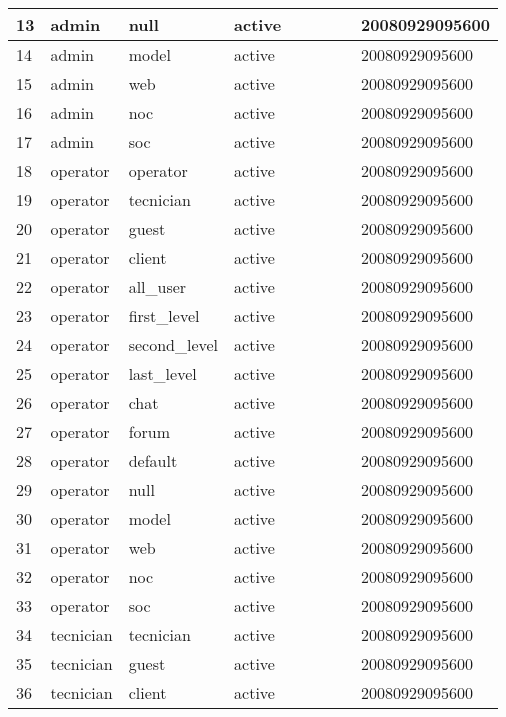 \begin{longtable}{|l|l|l|l|l|l|l|l|l|}
13 & admin & null & active &  &  &  &  & 20080929095600 \\ \hline 
14 & admin & model & active &  &  &  &  & 20080929095600 \\ \hline 
15 & admin & web & active &  &  &  &  & 20080929095600 \\ \hline 
16 & admin & noc & active &  &  &  &  & 20080929095600 \\ \hline 
17 & admin & soc & active &  &  &  &  & 20080929095600 \\ \hline 
18 & operator & operator & active &  &  &  &  & 20080929095600 \\ \hline 
19 & operator & tecnician & active &  &  &  &  & 20080929095600 \\ \hline 
20 & operator & guest & active &  &  &  &  & 20080929095600 \\ \hline 
21 & operator & client & active &  &  &  &  & 20080929095600 \\ \hline 
22 & operator & all\_user & active &  &  &  &  & 20080929095600 \\ \hline 
23 & operator & first\_level & active &  &  &  &  & 20080929095600 \\ \hline 
24 & operator & second\_level & active &  &  &  &  & 20080929095600 \\ \hline 
25 & operator & last\_level & active &  &  &  &  & 20080929095600 \\ \hline 
26 & operator & chat & active &  &  &  &  & 20080929095600 \\ \hline 
27 & operator & forum & active &  &  &  &  & 20080929095600 \\ \hline 
28 & operator & default & active &  &  &  &  & 20080929095600 \\ \hline 
29 & operator & null & active &  &  &  &  & 20080929095600 \\ \hline 
30 & operator & model & active &  &  &  &  & 20080929095600 \\ \hline 
31 & operator & web & active &  &  &  &  & 20080929095600 \\ \hline 
32 & operator & noc & active &  &  &  &  & 20080929095600 \\ \hline 
33 & operator & soc & active &  &  &  &  & 20080929095600 \\ \hline 
34 & tecnician & tecnician & active &  &  &  &  & 20080929095600 \\ \hline 
35 & tecnician & guest & active &  &  &  &  & 20080929095600 \\ \hline 
36 & tecnician & client & active &  &  &  &  & 20080929095600 \\ \hline 

\end{longtable}
